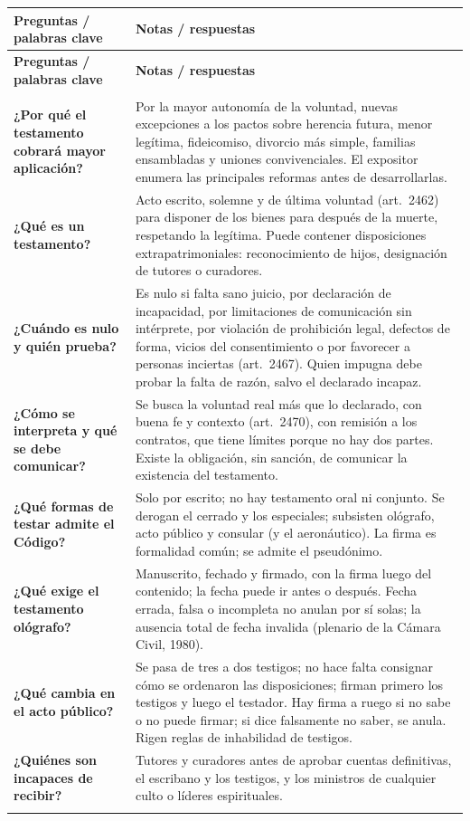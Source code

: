 \documentclass[12pt,oneside]{book}
\newenvironment{cornell}{%
    \begin{longtable}{>{\raggedright\arraybackslash}p{0.27\textwidth}
                      >{\raggedright\arraybackslash}p{0.66\textwidth}}
    \toprule
    \textbf{Preguntas / palabras clave} & \textbf{Notas / respuestas} \\
    \midrule
    \endfirsthead
    \toprule
    \textbf{Preguntas / palabras clave} & \textbf{Notas / respuestas} \\
    \midrule
    \endhead
    \midrule[0.3pt]
    \multicolumn{2}{r}{\footnotesize\textit{Continúa en la página siguiente}} \\
    \endfoot
    \endlastfoot
}{%
    \end{longtable}
}
\newcommand{\cornellrow}[2]{%
    \textbf{#1} & #2 \\
    \midrule[0.3pt]
}
\newcommand{\cornellsummary}[1]{%
    \midrule
    \multicolumn{2}{p{\dimexpr0.93\textwidth+2\tabcolsep\relax}}{%
        \textbf{Resumen:} #1} \\
    \bottomrule
}
\begin{document}
\begin{cornell}
\cornellrow{¿Por qué el testamento cobrará mayor aplicación?}{Por la mayor autonomía de la voluntad, nuevas excepciones a los pactos sobre herencia futura, menor legítima, fideicomiso, divorcio más simple, familias ensambladas y uniones convivenciales. El expositor enumera las principales reformas antes de desarrollarlas.}
\cornellrow{¿Qué es un testamento?}{Acto escrito, solemne y de última voluntad (art.~2462) para disponer de los bienes para después de la muerte, respetando la legítima. Puede contener disposiciones extrapatrimoniales: reconocimiento de hijos, designación de tutores o curadores.}
\cornellrow{¿Cuándo es nulo y quién prueba?}{Es nulo si falta sano juicio, por declaración de incapacidad, por limitaciones de comunicación sin intérprete, por violación de prohibición legal, defectos de forma, vicios del consentimiento o por favorecer a personas inciertas (art.~2467). Quien impugna debe probar la falta de razón, salvo el declarado incapaz.}
\cornellrow{¿Cómo se interpreta y qué se debe comunicar?}{Se busca la voluntad real más que lo declarado, con buena fe y contexto (art.~2470), con remisión a los contratos, que tiene límites porque no hay dos partes. Existe la obligación, sin sanción, de comunicar la existencia del testamento.}
\cornellrow{¿Qué formas de testar admite el Código?}{Solo por escrito; no hay testamento oral ni conjunto. Se derogan el cerrado y los especiales; subsisten ológrafo, acto público y consular (y el aeronáutico). La firma es formalidad común; se admite el pseudónimo.}
\cornellrow{¿Qué exige el testamento ológrafo?}{Manuscrito, fechado y firmado, con la firma luego del contenido; la fecha puede ir antes o después. Fecha errada, falsa o incompleta no anulan por sí solas; la ausencia total de fecha invalida (plenario de la Cámara Civil, 1980).}
\cornellrow{¿Qué cambia en el acto público?}{Se pasa de tres a dos testigos; no hace falta consignar cómo se ordenaron las disposiciones; firman primero los testigos y luego el testador. Hay firma a ruego si no sabe o no puede firmar; si dice falsamente no saber, se anula. Rigen reglas de inhabilidad de testigos.}
\cornellrow{¿Quiénes son incapaces de recibir?}{Tutores y curadores antes de aprobar cuentas definitivas, el escribano y los testigos, y los ministros de cualquier culto o líderes espirituales.}
\cornellsummary{Las reformas en testamentos incluyen nuevas reglas de capacidad y de prueba (quien impugna prueba la falta de razón), interpretación de la voluntad real, formas reducidas (ológrafo, acto público y consular), reducción de formalidades y causales de nulidad ampliadas. Se persigue una mayor autonomía de la voluntad con límites claros que protegen la legítima, a los terceros y la seguridad jurídica.}
\end{cornell}
\end{document}
